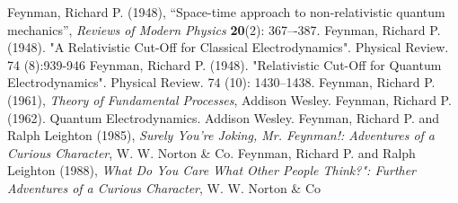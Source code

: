 \documentclass[12pt]{article}
\begin{document}

\begin{thebibliography}{99}
 Feynman, Richard P. (1948), ``Space-time approach to non-relativistic quantum mechanics'', {\em Reviews of Modern Physics} {\bf 20}(2): 367–-387.
 Feynman, Richard P. (1948). "A Relativistic Cut-Off for Classical Electrodynamics". Physical Review. 74 (8):939-946
 Feynman, Richard P. (1948). "Relativistic Cut-Off for Quantum Electrodynamics". Physical Review. 74 (10): 1430–1438.
 Feynman, Richard P. (1961), {\em Theory of Fundamental Processes}, Addison Wesley.
 Feynman, Richard P. (1962). Quantum Electrodynamics. Addison Wesley.
 Feynman, Richard P. and Ralph Leighton (1985),  {\em Surely You're Joking, Mr. Feynman!: Adventures of a Curious Character}, W. W. Norton \& Co.
Feynman, Richard P. and Ralph Leighton (1988),  {\em What Do You Care What Other People Think?": Further Adventures of a Curious Character}, W. W. Norton \& Co

\end{thebibliography}


    
\end{document}
